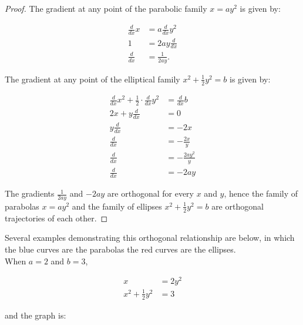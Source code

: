 \documentclass{article}
\begin{document}
    \begin{proof}
        The gradient at any point of the parabolic family $x=ay^2$ is given by:

        \begin{align*}
            \frac{d}{dx} x  &= a\frac{d}{dx} y^2 \\
            1               &= 2ay \frac{d}{dx} \\
            \frac{d}{dx}    &= \frac{1}{2ay}.
        \end{align*}

        The gradient at any point of the elliptical family $x^2 + \frac{1}{2} y^2 = b$ is given by:

        \begin{align*}
            \frac{d}{dx} x^2 + \frac{1}{2} \cdot \frac{d}{dx} y^2   &= \frac{d}{dx} b \\
            2x + y\frac{d}{dx}                                      &= 0 \\
            y\frac{d}{dx}                                           &= -2x \\
            \frac{d}{dx}                                            &= -\frac{2x}{y} \\
            \frac{d}{dx}                                            &= -\frac{2ay^2}{y} \\
            \frac{d}{dx}                                            &= -2ay
        \end{align*}

        The gradients $\frac{1}{2ay}$ and $-2ay$ are orthogonal for every $x$ and $y$, hence the family of parabolas $x=ay^2$ and the family of ellipses $x^2 + \frac{1}{2}y^2 = b$ are orthogonal trajectories of each
        other.
    \end{proof}

    Several examples demonstrating this orthogonal relationship are below, in which the blue curves are the parabolas the red curves are the ellipses. \\

    When $a=2$ and $b=3$,

    \begin{align*}
        x &= 2y^2 \\
        x^2 + \frac{1}{2} y^2 &= 3
    \end{align*}

    and the graph is:
\end{document}
